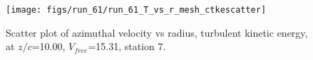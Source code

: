 \begin{figure}[H]
\centering
\texttt{[image: figs/run\_61/run\_61\_T\_vs\_r\_mesh\_ctkescatter]}
\caption{Scatter plot of azimuthal velocity vs radius, turbulent kinetic energy, at $z/c$=10.00, $V_{free}$=15.31, station 7.}
\label{fig:run_61_T_vs_r_mesh_ctkescatter}
\end{figure}


